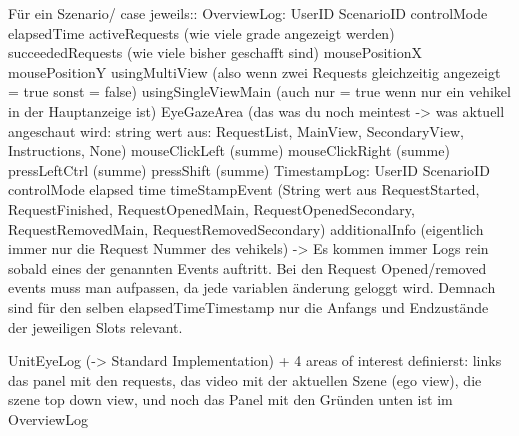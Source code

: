 Für ein Szenario/ case jeweils::
OverviewLog:
UserID
ScenarioID
controlMode
elapsedTime
activeRequests (wie viele grade angezeigt werden)
succeededRequests (wie viele bisher geschafft sind)
mousePositionX
mousePositionY
usingMultiView (also wenn zwei Requests gleichzeitig angezeigt = true sonst = false)
usingSingleViewMain (auch nur = true wenn nur ein vehikel in der Hauptanzeige ist)
EyeGazeArea (das was du noch meintest -> was aktuell angeschaut wird: string wert aus: RequestList, MainView, SecondaryView, Instructions, None)
mouseClickLeft (summe)
mouseClickRight (summe)
pressLeftCtrl (summe)
pressShift (summe)
TimestampLog:
UserID
ScenarioID
controlMode
elapsed time
timeStampEvent (String wert aus RequestStarted, RequestFinished, RequestOpenedMain, RequestOpenedSecondary, RequestRemovedMain, RequestRemovedSecondary)
additionalInfo (eigentlich immer nur die Request Nummer des vehikels)
-> Es kommen immer Logs rein sobald eines der genannten Events auftritt. Bei den Request Opened/removed events muss man aufpassen, da jede variablen änderung geloggt wird. Demnach sind für den selben elapsedTimeTimestamp nur die Anfangs und Endzustände der jeweiligen Slots relevant.



UnitEyeLog (-> Standard Implementation) + 
 4 areas of interest definierst: links das panel mit den requests, das video mit der aktuellen Szene (ego view),  die szene top down view, und noch das Panel mit den Gründen unten
ist im OverviewLog